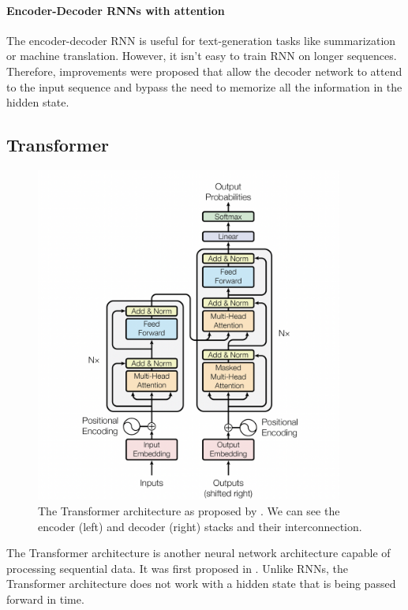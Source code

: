 \paragraph{Encoder-Decoder RNNs with attention}
The encoder-decoder RNN is useful for text-generation tasks like summarization or machine translation.
However, it isn't easy to train RNN on longer sequences.
Therefore, improvements were proposed \cite{bahdanau2014neural,luong-etal-2015-effective} that allow the decoder network to attend to the input sequence and bypass the need to memorize all the information in the hidden state.

\subsection{Transformer}
\label{background:trafo}
\begin{figure}[ht]
    \centering
    \includegraphics[width=0.9\textwidth]{images/transfo-arch.png}
    \caption{The Transformer architecture as proposed by \citet{vaswani2017attention}. We can see the encoder (left) and decoder (right) stacks and their interconnection.}
    \label{fig:trafo}
\end{figure}
The Transformer architecture is another neural network architecture capable of processing sequential data.
It was first proposed in \citet{vaswani2017attention}.
Unlike RNNs, the Transformer architecture does not work with a hidden state that is being passed forward in time.
